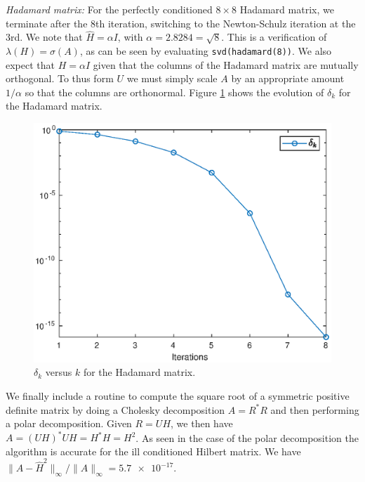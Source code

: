 \documentclass[12pt]{article}
\def\normo#1{\|#1\|_{\infty}}
\begin{document}
\textit{Hadamard matrix:} For the perfectly conditioned $8\times 8$ Hadamard
matrix, we terminate after the $8$th iteration, switching to the Newton-Schulz
iteration at the $3$rd. We note that $\hat{H} = \alpha I$, with
$\alpha = 2.8284 = \sqrt{8}$.  This is a verification of
$\lambda(H) = \sigma(A)$, as can be seen by evaluating
\texttt{svd(hadamard(8))}. We also expect that $H = \alpha I$ given that the
columns of the Hadamard matrix are mutually orthogonal. To thus form $U$ we must
simply scale $A$ by an appropriate amount $1/\alpha$ so that the columns are
orthonormal. Figure \ref{fig:hadamard} shows the evolution of $\delta_k$ for the
Hadamard matrix.
\begin{figure}
  \centering
  \includegraphics[scale=0.8]{hadamard}
  \caption{$\delta_k$ versus $k$ for the Hadamard matrix.}
  \label{fig:hadamard}    
\end{figure}

We finally include a routine to compute the square root of a symmetric positive
definite matrix by doing a Cholesky decomposition $A = R^*R$ and then performing
a polar decomposition.
Given $R = UH$, we then have $A = (UH)^*UH = H^*H = H^2$.
As seen in the case of the polar decomposition the algorithm is accurate for the
ill conditioned Hilbert matrix.
We have $\normo{A - \hat{H}^2}/\normo{A} = \num{5.7e-17}$.



\end{document}
